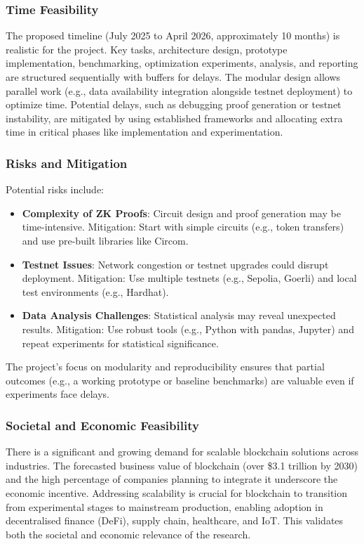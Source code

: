 \subsubsection{Time Feasibility}
\vspace{12pt}
The proposed timeline (July 2025 to April 2026, approximately 10 months) is realistic for the project. Key tasks, architecture design, prototype implementation, benchmarking, optimization experiments, analysis, and reporting are structured sequentially with buffers for delays. The modular design allows parallel work (e.g., data availability integration alongside testnet deployment) to optimize time. Potential delays, such as debugging proof generation or testnet instability, are mitigated by using established frameworks and allocating extra time in critical phases like implementation and experimentation.
\vspace{12pt}

\subsubsection{Risks and Mitigation}
\vspace{12pt}
Potential risks include:
\vspace{12pt}
\begin{itemize}
    \item \textbf{Complexity of ZK Proofs}: Circuit design and proof generation may be time-intensive. Mitigation: Start with simple circuits (e.g., token transfers) and use pre-built libraries like Circom.
    \item \textbf{Testnet Issues}: Network congestion or testnet upgrades could disrupt deployment. Mitigation: Use multiple testnets (e.g., Sepolia, Goerli) and local test environments (e.g., Hardhat).
    \item \textbf{Data Analysis Challenges}: Statistical analysis may reveal unexpected results. Mitigation: Use robust tools (e.g., Python with pandas, Jupyter) and repeat experiments for statistical significance.
\end{itemize}
\vspace{12pt}
The project’s focus on modularity and reproducibility ensures that partial outcomes (e.g., a working prototype or baseline benchmarks) are valuable even if experiments face delays.
\vspace{12pt}

\subsubsection{Societal and Economic Feasibility}
\vspace{12pt}
There is a significant and growing demand for scalable blockchain solutions across industries. The forecasted business value of blockchain (over \$3.1 trillion by 2030) and the high percentage of companies planning to integrate it underscore the economic incentive. Addressing scalability is crucial for blockchain to transition from experimental stages to mainstream production, enabling adoption in decentralised finance (DeFi), supply chain, healthcare, and IoT. This validates both the societal and economic relevance of the research.
\vspace{12pt}

